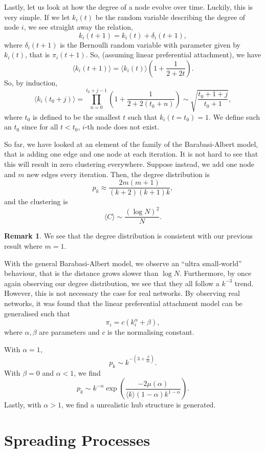 \documentclass[
]{article}
\theoremstyle{definition}
\newtheorem*{remark}{Remark}
\theoremstyle{definition}
\begin{document}
Lastly, let us look at how the degree of a node evolve over time.
Luckily, this is very simple. If we let \(k_i(t)\) be the random
variable describing the degree of node \(i\), we see straight away the
relation, \[k_i(t + 1) = k_i(t) + \delta_i(t + 1),\] where
\(\delta_i(t + 1)\) is the Bernoulli random variable with parameter
given by \(k_i(t)\), that is \(\pi_i(t + 1)\). So, (assuming linear
preferential attachment), we have
\[\langle k_i(t + 1) \rangle = \langle k_i(t) \rangle\left(1 + \frac{1}{2 + 2t}\right).\]
So, by induction, \[\langle k_i(t_0 + j) \rangle = 
  \prod_{n = 0}^{t_0 + j - 1}\left( 1 + \frac{1}{2 + 2(t_0 + n)} \right)
  \sim \sqrt{\frac{t_0 + 1 + j}{t_0 + 1}},\] where \(t_0\) is defined to
be the smallest \(t\) such that \(k_i(t = t_0) = 1\). We define such an
\(t_0\) since for all \(t < t_0\), \(i\)-th node does not exist.

So far, we have looked at an element of the family of the
Barabasi-Albert model, that is adding one edge and one node at each
iteration. It is not hard to see that this will result in zero
clustering everywhere. Suppose instead, we add one node and \(m\) new
edges every iteration. Then, the degree distribution is
\[p_k \approx \frac{2m(m + 1)}{(k + 2)(k + 1)k},\] and the clustering is
\[\langle C \rangle \sim \frac{(\log N)^2}{N}.\]

\begin{remark}
  We see that the degree distribution is consistent with our previous result 
  where \(m = 1\).
\end{remark}

With the general Barabasi-Albert model, we observe an ``ultra
small-world'' behaviour, that is the distance grows slower than
\(\log N\). Furthermore, by once again observing our degree
distribution, we see that they all follow a \(k^{-3}\) trend. However,
this is not necessary the case for real networks. By observing real
networks, it was found that the linear preferential attachment model can
be generalised such that \[\pi_i = c(k_i^\alpha + \beta),\] where
\(\alpha, \beta\) are parameters and \(c\) is the normalising constant.

With \(\alpha = 1\),
\[p_k \sim k^{- \left(3 + \frac{\beta}{m}\right)}.\] With \(\beta = 0\)
and \(\alpha < 1\), we find
\[p_k \sim k^{-\alpha}\exp\left(\frac{-2 \mu(\alpha)}
{\langle k\rangle (1 - \alpha)k^{1 - \alpha}}\right).\] Lastly, with
\(\alpha > 1\), we find a unrealistic hub structure is generated.

\newpage

\hypertarget{spreading-processes}{%
\section{Spreading Processes}\label{spreading-processes}}
\end{document}
